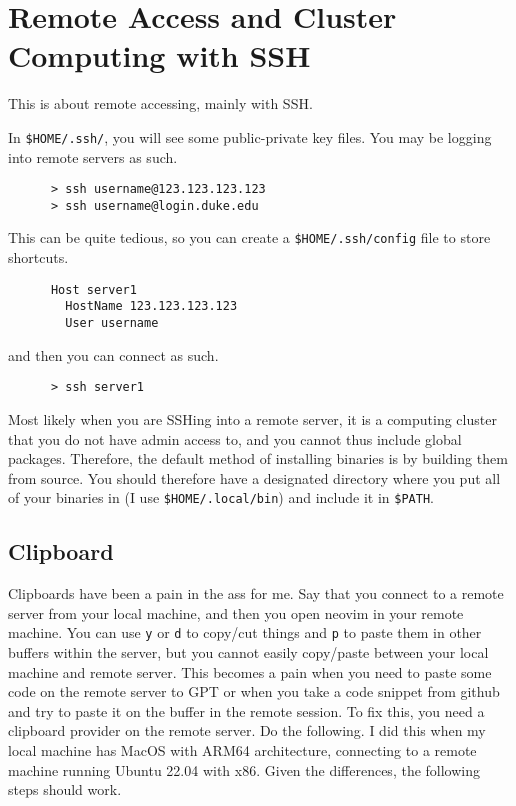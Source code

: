 \section{Remote Access and Cluster Computing with SSH} 

  This is about remote accessing, mainly with SSH. 

  \begin{definition}
    In \texttt{\$HOME/.ssh/}, you will see some public-private key files. You may be logging into remote servers as such. 

    \begin{lstlisting}
      > ssh username@123.123.123.123 
      > ssh username@login.duke.edu
    \end{lstlisting}

    This can be quite tedious, so you can create a \texttt{\$HOME/.ssh/config} file to store shortcuts. 
    \begin{lstlisting}
      Host server1
        HostName 123.123.123.123
        User username
    \end{lstlisting}
    and then you can connect as such. 
    \begin{lstlisting}
      > ssh server1
    \end{lstlisting}
  \end{definition}

  \begin{definition}
    Most likely when you are SSHing into a remote server, it is a computing cluster that you do not have admin access to, and you cannot thus include global packages. Therefore, the default method of installing binaries is by building them from source. You should therefore have a designated directory where you put all of your binaries in (I use \texttt{\$HOME/.local/bin}) and include it in \texttt{\$PATH}. 
  \end{definition}

\subsection{Clipboard}

  Clipboards have been a pain in the ass for me. Say that you connect to a remote server from your local machine, and then you open neovim in your remote machine. You can use \texttt{y} or \texttt{d} to copy/cut things and \texttt{p} to paste them in other buffers within the server, but you cannot easily copy/paste between your local machine and remote server. This becomes a pain when you need to paste some code on the remote server to GPT or when you take a code snippet from github and try to paste it on the buffer in the remote session. To fix this, you need a clipboard provider on the remote server. Do the following. I did this when my local machine has MacOS with ARM64 architecture, connecting to a remote machine running Ubuntu 22.04 with x86. Given the differences, the following steps should work. 

